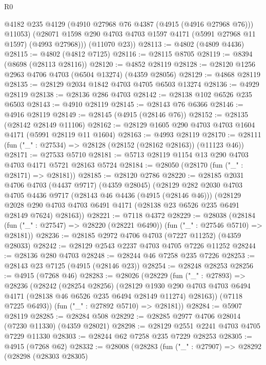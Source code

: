 \begin{lexlean}{R0}
\begin{coremodule}
          @4182
          @235
          @4129
          (@4910 @27968 @76 @4387 (@4915 (@4916 @27968 @76)))
          @11053)
        (@28071 @1598 @290 @4703 @4703 @1597 @4171 (@5991 @27968 @11 @1597) (@4993 @27968)))
      (@11070 @23))
@28113 := @4802 (@4809 @4436)
@28115 := @4802 (@4812 @7125)
@28116 := @28115 @8705
@28119 := @8394 (@8698 (@28113 @28116))
@28120 := @4852 @28119
@28128 := @28120 @1256 @2963 @4706 @4703 (@6504 @13274) (@4359 @28056)
@28129 := @4868 @28119
@28135 := @28129 @2034 @1842 @4703 @4705 @6503 @13274
@28136 := @4929 @28119
@28138 := @28136 @286 @4703
@28142 := @28138 @102 @6526 @235 @6503
@28143 := @4910 @28119
@28145 := @28143 @76 @6366
@28146 := @4916 @28119
@28149 := @28145 (@4915 (@28146 @76))
@28152 := @28135 (@28142 @28149 @11106)
@28162 := @28129 @1605 @290 @4703 @4703 @1604 @4171 (@5991 @28119 @11 @1604)
@28163 := @4993 @28119
@28170 := @28111 (fun ("_" : @27534) => @28128 (@28152 (@28162 @28163)) (@11123 @46))
@28171 := @27533 @5710
@28181 := @5713 @28119 @1154 @13 @290 @4703 @4703 @4171 @5721 @28163 @5724
@28184 := @28050 (@28170 (fun ("_" : @28171) => @28181))
@28185 := @28120 @2786
@28220 := @28185
    @2031
    @4706
    @4703
    (@4437 @9717)
    (@4359 @28045)
    (@28129
      @282
      @2030
      @4703
      @4705
      @4436
      @9717
      (@28143 @46 @4436 (@4915 (@28146 @46)))
      (@28129 @2028 @290 @4703 @4703 @6491 @4171 (@28138 @23 @6526 @235 @6491 @28149 @7624) @28163))
@28221 := @7118 @4372
@28229 := @28038
    (@28184 (fun ("_" : @27547) => @28220 (@28221 @6490)) (fun ("_" : @27546 @5710) => @28181))
@28236 := @28185 @2972 @4706 @4703 (@7227 @11252) (@4359 @28033)
@28242 := @28129 @2543 @2237 @4703 @4705 @7226 @11252
@28244 := @28136 @280 @4703
@28248 := @28244 @46 @7258 @235 @7226
@28253 := @28143 @23 @7125 (@4915 (@28146 @23))
@28254 := @28248 @28253
@28256 := @4915 (@7268 @46)
@28283 := @28026
    (@28229
      (fun ("_" : @27893) =>
      @28236
        (@28242
          (@28254 @28256)
          (@28129
            @1930
            @290
            @4703
            @4703
            @6494
            @4171
            (@28138 @46 @6526 @235 @6494 @28149 @11274)
            @28163))
        (@7118 @7225 @6493))
      (fun ("_" : @27892 @5710) => @28181))
@28284 := @5907 @28119
@28285 := @28284 @508
@28292 := @28285 @2977 @4706 @28014 (@7230 @11330) (@4359 @28021)
@28298 := @28129 @2551 @2241 @4703 @4705 @7229 @11330
@28303 := @28244 @62 @7258 @235 @7229 @28253
@28305 := @4915 (@7268 @62)
@28332 := @28008
    (@28283
      (fun ("_" : @27907) =>
      @28292
        (@28298
          (@28303 @28305)

\end{coremodule}
\end{lexlean}
